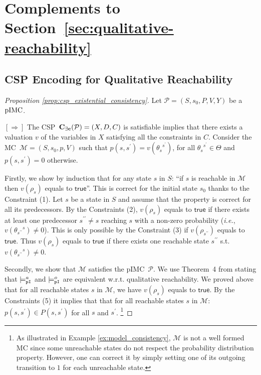 \documentclass{llncs}
\newcommand{\mc}{\textnormal{MC}}
\newcommand{\pimc}{\textnormal{pIMC}}
\newcommand{\csp}{\textnormal{CSP}}
\newcommand{\satisfactionPimc}{\ensuremath{\models^a_{\tt{pI}}}}
\newcommand{\satisfactionPimcOnce}{\ensuremath{\models^o_{\tt{pI}}}}
\newcommand{\Mec} {\ensuremath{{\bf C_{{\exists}c}}}}
\newcommand{\ie} {{\em i.e.},\ }
\newcommand{\ttransition}[1]{\ensuremath{\theta_{#1}}}
\newcommand{\transition}[2]{\ensuremath{\ttransition{#1}^{#2}}}
\newcommand{\transitionSet}{\ensuremath{\Theta}}
\newcommand{\true}             {\ensuremath{\mathsf{true}}}
\begin{document}
\section{Complements to Section~\ref{sec:qualitative-reachability}}
\subsection{{\csp} Encoding for Qualitative Reachability}

\begin{proof}[Proposition \ref{prop:csp_existential_consistency}]
Let $\mathcal{P} = (S,s_0,P,V,Y)$ be a $\pimc$.

$[\Rightarrow]$ The \csp\ $\Mec(\mathcal{P}) = (X,D,C)$ is satisfiable
implies that there exists a valuation $v$ of the variables in $X$ satisfying all the constraints in $C$.
Consider the \mc\ $\mathcal{M} = (S, s_0, p, V)$ such that 
$p(s, s^\prime) = v(\transition{s}{s^\prime})$, for all $\transition{s}{s^\prime} \in \transitionSet$
and $p(s, s^\prime) = 0$ otherwise.

Firstly, we show by induction that for any state $s$ in $S$:
``if $s$ is reachable in $\mathcal{M}$ then $v(\rho_s)$ equals to {\true}''.
This is correct for the initial state $s_0$ thanks to the Constraint (1).
Let $s$ be a state in $S$ and assume 
that the property is correct for all its predecessors.
By the Constraints (2), $v(\rho_s)$ equals to {\true} if 
there exists at least one predecessor $s^{\prime\prime} \neq s$ reaching $s$ with a non-zero probability 
(\ie $v(\transition{s^{\prime\prime}}{s}) \neq 0$).
This is only possible by the Constraint (3) if $v(\rho_{s^{\prime\prime}})$ equals to {\true}.
Thus $v(\rho_s)$ equals to {\true} if there exists one reachable state $s^{\prime\prime}$ s.t. 
$v(\transition{s^{\prime\prime}}{s}) \neq 0$.

Secondly, we show that $\mathcal{M}$ satisfies the \pimc\ $\mathcal{P}$.
We use Theorem~4 from \cite{DelahayeLP16} stating that
$\satisfactionPimc$ and $\satisfactionPimcOnce$ are equivalent w.r.t. 
qualitative reachability.
We proved above that for all reachable states $s$ in $\mathcal{M}$,
we have $v(\rho_s)$ equals to {\true}.
By the Constraints (5) it implies that 
that for all reachable states $s$ in $\mathcal{M}$: $p(s,s^\prime) \in P(s,s^\prime)$ for all $s$ and $s^\prime$.%
\footnote{As illustrated in Example \ref{ex:model_consistency},
$\mathcal{M}$ is not a well formed {\mc} since some unreachable states do not respect the probability distribution property. 
However, one can correct it by simply setting one of its outgoing transition to $1$ for each unreachable state.}


\end{proof}
\end{document}
